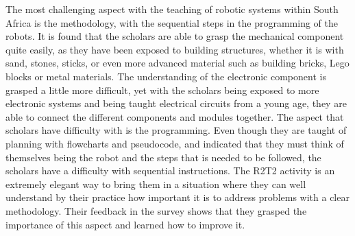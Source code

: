 \documentclass{intech-journal}
\begin{document}
The most challenging aspect with the teaching of robotic systems within South Africa is the methodology, with the sequential steps in the programming of the robots. 
It is found that the scholars are able to grasp the mechanical component quite easily, as they have been exposed to building structures, whether it is with sand, stones, sticks, or even more advanced material such as building bricks, Lego blocks or metal materials. 
The understanding of the electronic component is grasped a little more difficult, yet with the scholars being exposed to more electronic systems and being taught electrical circuits from a young age, they are able to connect the different components and modules together. 
The aspect that scholars have difficulty with is the programming. 
Even though they are taught of planning with flowcharts and pseudocode, and indicated that they must think of themselves being the robot and the steps that is needed to be followed, the scholars have a difficulty with sequential instructions. 
The R2T2 activity is an extremely elegant way to bring them in a situation where they can well understand by their practice how important it is to address problems with a clear methodology. 
Their feedback in the survey shows that they grasped the importance of this aspect and learned how to improve it.

\end{document}
